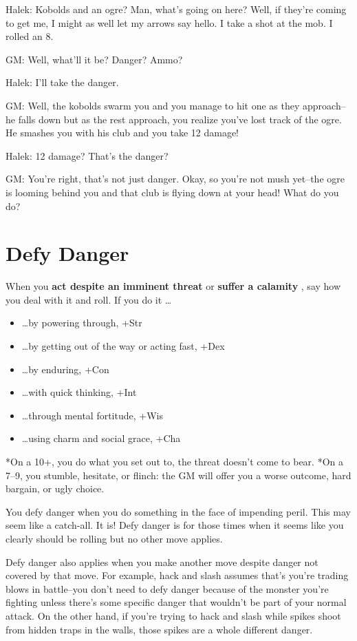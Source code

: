  Halek: Kobolds and an ogre? Man, what's going on here? Well, if they're coming to get me, I might as well let my arrows say hello. I take a shot at the mob. I rolled an 8.


 GM: Well, what'll it be? Danger? Ammo?


 Halek: I'll take the danger.


 GM: Well, the kobolds swarm you and you manage to hit one as they approach--he falls down but as the rest approach, you realize you've lost track of the ogre. He smashes you with his club and you take 12 damage!


 Halek: 12 damage? That's the danger?


 GM: You're right, that's not just danger. Okay, so you're not mush yet--the ogre is looming behind you and that club is flying down at your head! What do you do?
\section{Defy Danger}


 When you \textbf{act despite an imminent threat}
 or \textbf{suffer a calamity}
, say how you deal with it and roll. If you do it \ldots 
\begin{itemize}
\item  \ldots by powering through, +Str
\item  \ldots by getting out of the way or acting fast, +Dex
\item  \ldots by enduring, +Con
\item  \ldots with quick thinking, +Int
\item  \ldots through mental fortitude, +Wis
\item  \ldots using charm and social grace, +Cha

\end{itemize}


 *On a 10+, you do what you set out to, the threat doesn't come to bear. *On a 7--9, you stumble, hesitate, or flinch: the GM will offer you a worse outcome, hard bargain, or ugly choice.


 You defy danger when you do something in the face of impending peril. This may seem like a catch-all. It is! Defy danger is for those times when it seems like you clearly should be rolling but no other move applies.


 Defy danger also applies when you make another move despite danger not covered by that move. For example, hack and slash assumes that's you're trading blows in battle--you don't need to defy danger because of the monster you're fighting unless there's some specific danger that wouldn't be part of your normal attack. On the other hand, if you're trying to hack and slash while spikes shoot from hidden traps in the walls, those spikes are a whole different danger.


